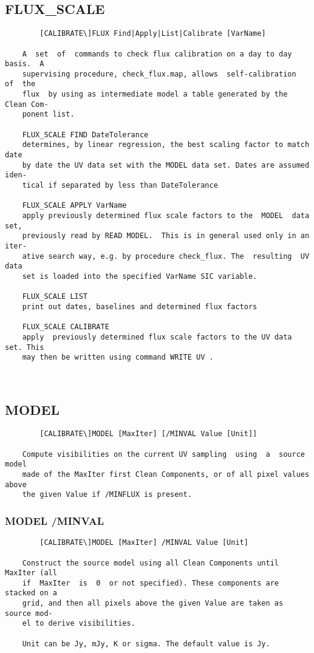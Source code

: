 \subsection{FLUX\_SCALE}
\begin{verbatim}
        [CALIBRATE\]FLUX Find|Apply|List|Calibrate [VarName]

    A  set  of  commands to check flux calibration on a day to day basis.  A
    supervising procedure, check_flux.map, allows  self-calibration  of  the
    flux  by using as intermediate model a table generated by the Clean Com-
    ponent list.

    FLUX_SCALE FIND DateTolerance
    determines, by linear regression, the best scaling factor to match  date
    by date the UV data set with the MODEL data set. Dates are assumed iden-
    tical if separated by less than DateTolerance

    FLUX_SCALE APPLY VarName
    apply previously determined flux scale factors to the  MODEL  data  set,
    previously read by READ MODEL.  This is in general used only in an iter-
    ative search way, e.g. by procedure check_flux. The  resulting  UV  data
    set is loaded into the specified VarName SIC variable.

    FLUX_SCALE LIST
    print out dates, baselines and determined flux factors

    FLUX_SCALE CALIBRATE
    apply  previously determined flux scale factors to the UV data set. This
    may then be written using command WRITE UV .



\end{verbatim}
\subsection{MODEL}
\begin{verbatim}
        [CALIBRATE\]MODEL [MaxIter] [/MINVAL Value [Unit]]

    Compute visibilities on the current UV sampling  using  a  source  model
    made of the MaxIter first Clean Components, or of all pixel values above
    the given Value if /MINFLUX is present.

\end{verbatim}
\subsubsection{MODEL /MINVAL}
\begin{verbatim}
        [CALIBRATE\]MODEL [MaxIter] /MINVAL Value [Unit]

    Construct the source model using all Clean Components until MaxIter (all
    if  MaxIter  is  0  or not specified). These components are stacked on a
    grid, and then all pixels above the given Value are taken as source mod-
    el to derive visibilities.

    Unit can be Jy, mJy, K or sigma. The default value is Jy.

\end{verbatim}
